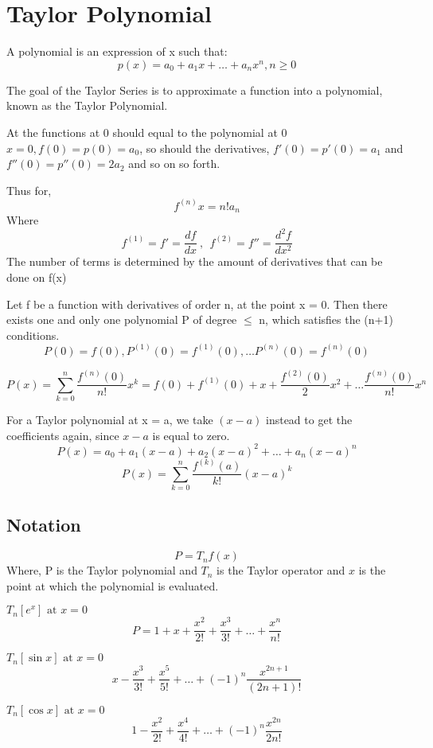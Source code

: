 \documentclass[twoside]{report}
\begin{document}
\section{Taylor Polynomial} %
\label{sec:taylor_polynomial}

\begin{definition}[Polynomials]
	A polynomial is an expression of x such that:
	\begin{displaymath}
	   p(x) = a_0 + a_1x + \dots + a_n x^n , n \geq 0 
	\end{displaymath}
\end{definition}

The goal of the Taylor Series is to approximate a function into a polynomial, known as the Taylor Polynomial.

At the functions at 0 should equal to the polynomial at 0 $x = 0, f(0) = p(0) = a_0$, so should the derivatives, $f'(0) = p'(0) = a_1$ and $f''(0) = p''(0) = 2a_2$ and so on so forth. 

Thus for,
\[
   f^{(n)}x = n!a_n
\]
Where \[
   f^{(1)} = f' = \frac{df}{dx} \ , \ \ f^{(2)} = f'' = \frac{d^2f}{dx^2}
\]
The number of terms is determined by the amount of derivatives that can be done on f(x)
\begin{theorem}
	Let f be a function with derivatives of order n, at the point x = 0. Then there exists one and only one polynomial P of degree $\leq$ n, which satisfies the (n+1) conditions. 
	\[
	   P(0) = f(0), P^{(1)}(0) = f^{(1)}(0), \dots P^{(n)}(0) = f^{(n)}(0)
	\]
	
	\[
	   P(x) = \sum_{k=0}^{n} \frac{f^{(n)}(0)}{n!} x^k = f(0) + f^{(1)}(0) + x + \frac{f^{(2)}(0)}{2}x^2 + \dots \frac{f^{(n)}(0)}{n!}x^n
	\]
\end{theorem}
For a Taylor polynomial at x = a, we take $(x-a)$ instead to get the coefficients again, since $x - a$ is equal to zero.
\[
   P(x) = a_0 + a_1(x-a) + a_2(x-a)^2 + \dots + a_n (x-a)^n 
\]
\[
   P(x) = \sum_{k=0}^n \frac{f^{(k)}(a)}{k!}(x-a)^k
\]
\subsection{Notation}
\[
P = T_n f(x)
\]
Where, P is the Taylor polynomial and $T_n$ is the Taylor operator and $x
$ is the point at which the polynomial is evaluated.
\begin{example}
   $T_n[e^x] \text{ at } x = 0$
   \[
      P = 1 + x + \frac{x^2}{2!} + \frac{x^3}{3!} + \dots + \frac{x^n}{n!}
   \]
\end{example}
\begin{example}
   $T_n[\sin{x}] \text{ at } x = 0$
   \[
      x - \frac{x^3}{3!} + \frac{x^5}{5!} + \dots + (-1)^{n}\frac{x^{2n+1}}{(2n+1)!}
   \]
\end{example}
\begin{example}
   $T_n[\cos{x}] \text{ at } x = 0$
   \[
      1 - \frac{x^2}{2!} + \frac{x^4}{4!} + \dots + (-1)^{n}\frac{x^{2n}}{2n!}
   \]
\end{example}
\end{document}
